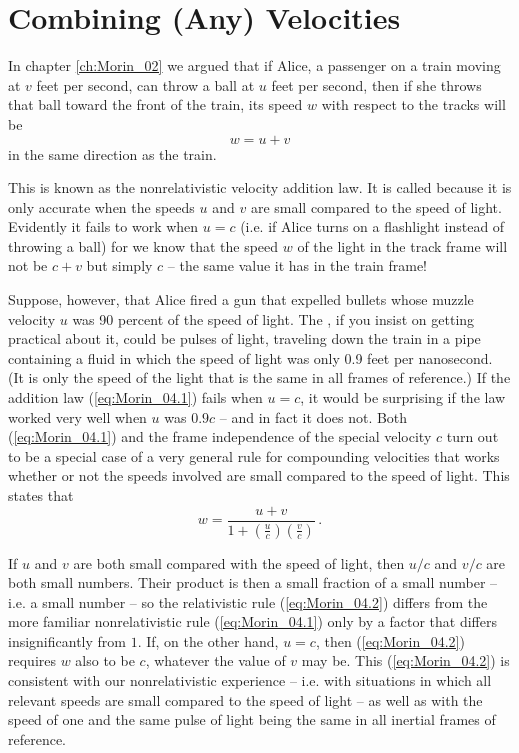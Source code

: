 \chapter{Combining (Any) Velocities}
\label{ch:Morin_04}

In chapter \ref{ch:Morin_02} we argued that if Alice, a passenger on a train moving at $v$ feet per second, can throw a ball at $u$ feet per second, then if she throws that ball toward the front of the train, its speed $w$ with respect to the tracks will be 
\begin{equation}\label{eq:Morin_04.1}
w = u + v
\end{equation}
in the same direction as the train.

This is known as the nonrelativistic velocity addition law. It is called  because it is only accurate when the speeds $u$ and $v$ are small compared to the speed of light. Evidently it fails to work when $u = c$ (i.e. if Alice turns on a flashlight instead of throwing a ball) for we know that the speed $w$ of the light in the track frame will not be $c + v$ but simply $c$ -- the same value it has in the train frame!

Suppose, however, that Alice fired a gun that expelled bullets whose muzzle velocity $u$ was 90 percent of the speed of light. The , if you insist on getting practical about it, could be pulses of light, traveling down the train in a pipe containing a fluid in which the speed of light was only 0.9 feet per nanosecond. (It is only the speed of the light  that is the same in all frames of reference.) If the addition law (\ref{eq:Morin_04.1}) fails when $u = c$, it would be surprising if the law worked very well when $u$ was $0.9c$ -- and in fact it does not. Both (\ref{eq:Morin_04.1}) and the frame independence of the special velocity $c$ turn out to be a special case of a very general rule for compounding velocities that works whether or not the speeds involved are small compared to the speed of light. This  states that
\begin{equation}\label{eq:Morin_04.2}
w = \frac{u + v}{1 + \left( \frac{u}{c}\right) \left( \frac{v}{c}\right)}\,.
\end{equation}

If $u$ and $v$ are both small compared with the speed of light, then $u/c$ and $v/c$ are both small numbers. Their product is then a small fraction of a small number -- i.e. a  small number -- so the relativistic rule (\ref{eq:Morin_04.2}) differs from the more familiar nonrelativistic rule (\ref{eq:Morin_04.1}) only by a factor that differs insignificantly from $1$. If, on the other hand, $u = c$, then (\ref{eq:Morin_04.2}) requires $w$ also to be $c$, whatever the value of $v$ may be. This (\ref{eq:Morin_04.2}) is consistent with our nonrelativistic experience -- i.e. with situations in which all relevant speeds are small compared to the speed of light -- as well as with the speed of one and the same pulse of light being the same in all inertial frames of reference.

